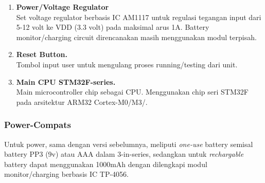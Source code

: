 \documentclass[12pt,]{article}
\begin{document}
\begin{enumerate}
		\item \textbf{Power/Voltage Regulator}\\
		Set voltage regulator berbasis IC AM1117 untuk regulasi tegangan input dari 5-12 volt ke VDD (3.3 volt) pada maksimal arus 1A.
		Battery monitor/charging circuit direncanakan masih menggunakan modul terpisah.
		
		\item \textbf{Reset Button.}\\
		Tombol input user untuk mengulang proses running/testing dari unit.
		
		\item \textbf{Main CPU STM32F-series.}\\
		Main microcontroller chip sebagai CPU. Menggunakan chip seri STM32F pada arsitektur ARM32 Cortex-M0/M3/.
		
	\end{enumerate}

	\subsubsection{Power-Compats}
	
	Untuk power, sama dengan versi sebelumnya, meliputi \textit{one-use} battery semisal battery PP3 (9v) atau AAA dalam 3-in-series,
	sedangkan untuk \textit{rechargable} battery dapat menggunakan 1000mAh dengan dilengkapi modul monitor/charging berbasis IC TP-4056.
	
\end{document}
